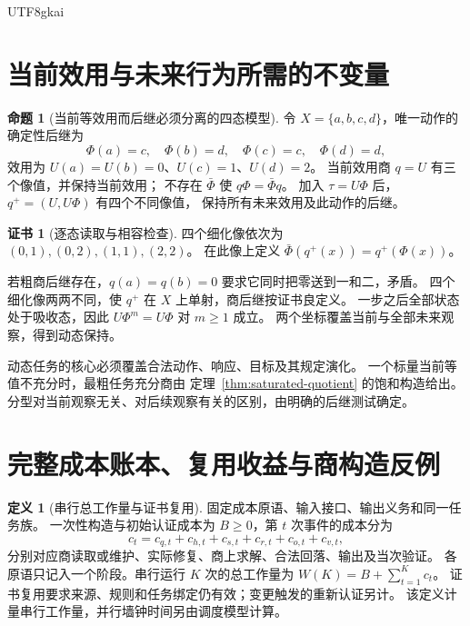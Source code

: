\documentclass[12pt]{report}
\makeatletter
\theoremstyle{definition}
\newtheorem{definition}{定义}[chapter]
\newtheorem{proposition}{命题}[chapter]
\newtheorem{Certificate}{证书}[chapter]
\renewenvironment{proof}[1][\proofname]{\par
  \pushQED{\qed}\normalfont
  \topsep6\p@\@plus6\p@\relax
  \trivlist
  \item[\hskip\labelsep\normalfont #1\@addpunct{.}]\ignorespaces
}{
  \popQED\endtrivlist\@endpefalse
}
\makeatother
\begin{document}
\begin{CJK*}{UTF8}{gkai}
\section{当前效用与未来行为所需的不变量}
\begin{proposition}[当前等效用而后继必须分离的四态模型]
\label{prop:future-sensitive-typing}
令 \(X=\{a,b,c,d\}\)，唯一动作的确定性后继为
\[
\Phi(a)=c,\quad\Phi(b)=d,\quad\Phi(c)=c,\quad\Phi(d)=d,
\]
效用为 \(U(a)=U(b)=0\)、\(U(c)=1\)、\(U(d)=2\)。
当前效用商 \(q=U\) 有三个像值，并保持当前效用；
不存在 \(\bar\Phi\) 使 \(q\Phi=\bar\Phi q\)。
加入 \(\tau=U\Phi\) 后，\(q^+=(U,U\Phi)\) 有四个不同像值，
保持所有未来效用及此动作的后继。
\end{proposition}
\begin{Certificate}[逐态读取与相容检查]
四个细化像依次为 \((0,1),(0,2),(1,1),(2,2)\)。
在此像上定义 \(\bar\Phi(q^+(x))=q^+(\Phi(x))\)。
\end{Certificate}
\begin{proof}
若粗商后继存在，\(q(a)=q(b)=0\) 要求它同时把零送到一和二，矛盾。
四个细化像两两不同，使 \(q^+\) 在 \(X\) 上单射，商后继按证书良定义。
一步之后全部状态处于吸收态，因此 \(U\Phi^m=U\Phi\) 对 \(m\ge1\) 成立。
两个坐标覆盖当前与全部未来观察，得到动态保持。
\end{proof}
动态任务的核心必须覆盖合法动作、响应、目标及其规定演化。
一个标量当前等值不充分时，最粗任务充分商由
定理~\ref{thm:saturated-quotient} 的饱和构造给出。
分型对当前观察无关、对后续观察有关的区别，由明确的后继测试确定。

\section{完整成本账本、复用收益与商构造反例}
\begin{definition}[串行总工作量与证书复用]
固定成本原语、输入接口、输出义务和同一任务族。
一次性构造与初始认证成本为 \(B\ge0\)，第 \(t\) 次事件的成本分为
\[
c_t=c_{q,t}+c_{h,t}+c_{s,t}+c_{r,t}+c_{o,t}+c_{v,t},
\]
分别对应商读取或维护、实际修复、商上求解、合法回落、输出及当次验证。
各原语只记入一个阶段。串行运行 \(K\) 次的总工作量为
\(W(K)=B+\sum_{t=1}^K c_t\)。
证书复用要求来源、规则和任务绑定仍有效；变更触发的重新认证另计。
该定义计量串行工作量，并行墙钟时间另由调度模型计算。
\end{definition}


\end{CJK*}
\end{document}

